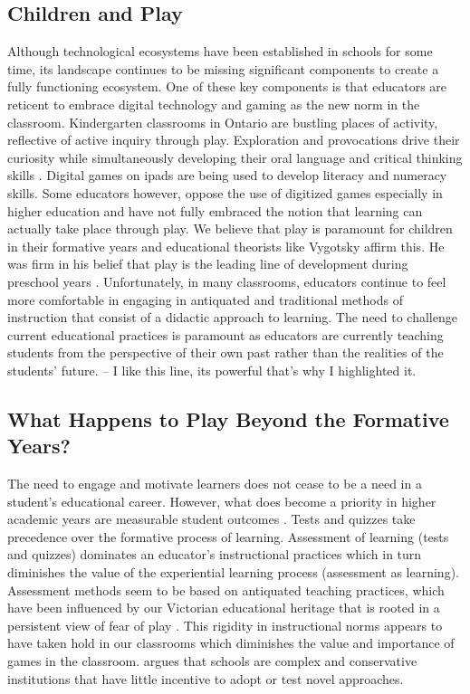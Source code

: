 \documentclass{article}
\begin{document}
\subsection{Children and Play}

Although technological ecosystems have been established in schools for some time, its landscape continues to be missing significant components to create a fully functioning ecosystem. One of these key components is that educators are reticent to embrace digital technology and gaming as the new norm in the classroom. Kindergarten classrooms in Ontario are bustling places of activity, reflective of active inquiry through play. Exploration and provocations drive their curiosity while simultaneously developing their oral language and critical thinking skills \citep{kindergartencurriculum}. Digital games on ipads are being used to develop literacy and numeracy skills. Some educators however, oppose the use of digitized games especially in higher education and have not fully embraced the notion that learning can actually take place through play. We believe that play is paramount for children in their formative years and educational theorists like Vygotsky affirm this. He was firm in his belief that play is the leading line of development during preschool years \citep{vygotsky1967play}. Unfortunately, in many classrooms, educators continue to feel more comfortable in engaging in antiquated and traditional methods of instruction that consist of a didactic approach to learning. The need to challenge current educational practices is paramount as educators are currently teaching students from the perspective of their own past rather than the realities of the students’ future. – I like this line, its powerful that’s why I highlighted it.

\subsection{What Happens to Play Beyond the Formative Years?}

The need to engage and motivate learners does not cease to be a need in a student’s educational career. However, what does become a priority in higher academic years are measurable student outcomes \citep{ball2012politics,shore2010beyond,leather2021pedagogy}. Tests and quizzes take precedence over the formative process of learning. Assessment of learning (tests and quizzes) dominates an educator’s instructional practices which in turn diminishes the value of the experiential learning process (assessment as learning). Assessment methods seem to be based on antiquated teaching practices, which have been influenced by our Victorian educational heritage that is rooted in a persistent view of fear of play \citep{wood2013play}. This rigidity in instructional norms appears to have taken hold in our classrooms which diminishes the value and importance of games in the classroom. \citet{reich2020failure} argues that schools are complex and conservative institutions that have little incentive to adopt or test novel approaches. 
\end{document}
